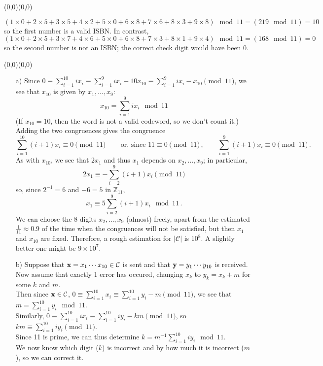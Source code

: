 \documentclass[11pt]{article}
\newcommand{\ds}{\displaystyle}
\newcommand{\moveup}{\begin{picture}(0,0)(0,0)\end{picture}\vspace*{-8.15mm}}
\begin{document}
\bigskip
{}\moveup
  \[
     (1\times0
    + 2\times5
    + 3\times5
    + 4\times2
    + 5\times0
    + 6\times8
    + 7\times6
    + 8\times3
    + 9\times8)
    \!\!\mod 11
    = (219 \!\!\mod 11)
    = 10
  \]
  so the first number is a valid ISBN.
  In contrast,
  \[
     (1\times0
    + 2\times5
    + 3\times7
    + 4\times6
    + 5\times0
    + 6\times8
    + 7\times3
    + 8\times1
    + 9\times4)
    \!\!\mod 11
    = (168 \!\!\mod 11)
    = 0
  \]
  so the second number is not an ISBN;
  the correct check digit would have been 0.


\newpage
{}\moveup
\begin{itemize}
  \item[{a)}] Since $\ds
       0
     \equiv \sum^{10}_{i=1} i x_i
     \equiv \sum^{9}_{i=1} i x_i + 10 x_{10}
     \equiv \sum^{9}_{i=1} i x_i - x_{10} \pmod{11}$,
    we see that $x_{10}$ is given by $x_1,\ldots,x_9$:
    \[
      x_{10} = \sum^{9}_{i=1} i x_i \mod{11}
    \]
    (If $x_{10} = 10$, then the word is not a valid codeword, so we don't count it.)\\
    Adding the two congruences gives the congruence
    \[
      \sum^{10}_{i=1} (i+1) x_i \equiv 0 \pmod{11}\,\qquad
      \text{or, since } 11\equiv 0\pmod{11}\,,\qquad
      \sum^{9}_{i=1} (i+1) x_i \equiv 0 \pmod{11}\,.
    \]
    As with $x_{10}$, we see that $2x_1$ and thus $x_1$ depends on $x_2,\ldots,x_9$;
    in particular,
    \[
      2x_1 \equiv -\sum^{9}_{i=2} (i+1) x_i \pmod{11}
    \]
    so, since $2^{-1} = 6$ and $-6 = 5$ in $\mathbb{Z}_{11}$,
    \[
      x_1 \equiv 5\sum^{9}_{i=2} (i+1) x_i \mod{11}\,.
    \]
    We can choose the 8 digits $x_2,\ldots,x_9$ (almost) freely,
    apart from the estimated $\frac{1}{11}\approx 0.9$ of the time when the congruences will not be satisfied,
    but then $x_1$ and $x_{10}$ are fixed.
    Therefore, a rough estimation for $|\mathcal{C}|$ is $10^8$.
    A slightly better one might be $9\times 10^7$.
  \item[{b)}]
    Suppose that ${\bf x} = x_1 \cdots x_{10}\in\mathcal{C}$ is sent
    and     that ${\bf y} = y_1 \cdots y_{10}$ is received.\\
    Now assume that exactly 1 error has occured,
    changing $x_k$ to $y_k = x_k + m$ for some $k$ and $m$.\\
    Then since ${\bf x}\in\mathcal{C}$,
    $\ds
      0\equiv \sum^{10}_{i=1} x_i
       \equiv \sum^{10}_{i=1} y_i - m\pmod{11}$,
    we see that $\ds m = \sum^{10}_{i=1} y_i \mod{11}$.\\
    Similarly,
    $\ds
      0\equiv \sum^{10}_{i=1} i x_i
       \equiv \sum^{10}_{i=1} i y_i - km\pmod{11}$,
    so $\ds km \equiv \sum^{10}_{i=1} i y_i\pmod{11}$.\\
    Since 11 is prime,
    we can thus determine $\ds k = m^{-1}\sum^{10}_{i=1} i y_i\mod{11}$.\\
    We now know which digit ($k$) is incorrect
    and by how much it is incorrect ($m$),
    so we can correct it.


\end{itemize}
\end{document}
